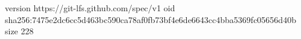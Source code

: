 version https://git-lfs.github.com/spec/v1
oid sha256:7475e2dc6cc5d463bc590ca78af0fb73bf4e6de6643cc4bba5369fc05656d40b
size 228
